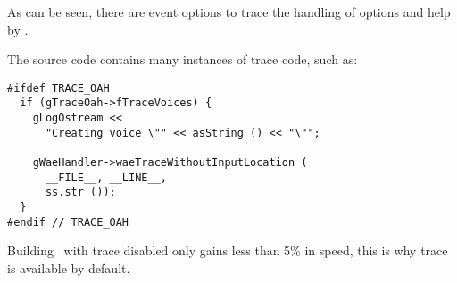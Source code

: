 As can be seen, there are event options to trace the handling of options and help by \xmlToLy.

The source code contains many instances of trace code, such as:
\begin{lstlisting}[language=CPlusPlus]
#ifdef TRACE_OAH
  if (gTraceOah->fTraceVoices) {
    gLogOstream <<
      "Creating voice \"" << asString () << "\"";

    gWaeHandler->waeTraceWithoutInputLocation (
      __FILE__, __LINE__,
      ss.str ());
  }
#endif // TRACE_OAH
\end{lstlisting}

Building \xmlToLy\ with trace disabled only gains less than 5\% in speed, this is why trace is available by default.


